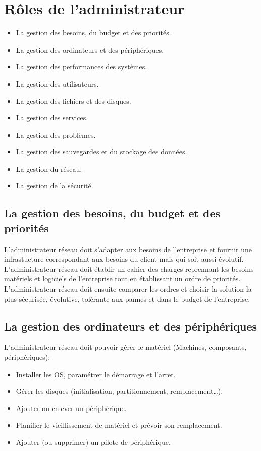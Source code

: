 \documentclass[10pt,a4paper]{article}
\begin{document}
 \section{Rôles de l'administrateur}
 \begin{itemize}
	 \item La gestion des besoins, du budget et des priorités.
	 \item La gestion des ordinateurs et des périphériques.
	 \item La gestion des performances des systèmes.
	 \item La gestion des utilisateurs.
	 \item La gestion des fichiers et des disques.
	 \item La gestion des services.
	 \item La gestion des problèmes.
	 \item La gestion des sauvegardes et du stockage des données.
	 \item La gestion du réseau.
	 \item La gestion de la sécurité.
 \end{itemize}

 \subsection{La gestion des besoins, du budget et des priorités}
 L'administrateur réseau doit s'adapter aux besoins de l'entreprise et fournir une infrastucture correspondant aux besoins du client mais qui soit aussi évolutif.\\
 L'administrateur réseau doit établir un cahier des charges reprennant les besoins matériels et logiciels de l'entreprise tout en établissant un ordre de priorités.\\
 L'administrateur réseau doit ensuite comparer les ordres et choisir la solution la plus sécurisée, évolutive, tolérante aux pannes et dans le budget de l'entreprise.

 \subsection{La gestion des ordinateurs et des périphériques}
 L'administrateur réseau doit pouvoir gérer le matériel (Machines, composants, périphériques):
 \begin{itemize}
	 \item Installer les OS, paramétrer le démarrage et l'arret.
	 \item Gérer les disques (initialisation, partitionnement, remplacement\ldots).
	 \item Ajouter ou enlever un périphérique.
	 \item Planifier le vieillissement de matériel et prévoir son remplacement.
	 \item Ajouter (ou supprimer) un pilote de périphérique.
 \end{itemize}
\end{document}

